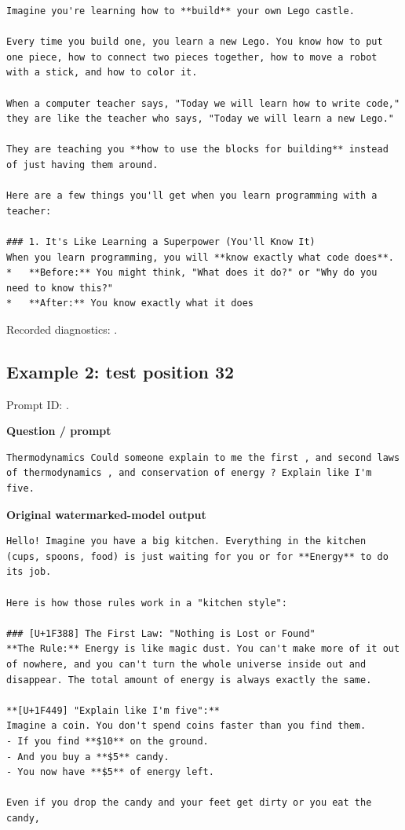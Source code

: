 \begin{Verbatim}
Imagine you're learning how to **build** your own Lego castle.

Every time you build one, you learn a new Lego. You know how to put one piece, how to connect two pieces together, how to move a robot with a stick, and how to color it.

When a computer teacher says, "Today we will learn how to write code," they are like the teacher who says, "Today we will learn a new Lego."

They are teaching you **how to use the blocks for building** instead of just having them around.

Here are a few things you'll get when you learn programming with a teacher:

### 1. It's Like Learning a Superpower (You'll Know It)
When you learn programming, you will **know exactly what code does**.
*   **Before:** You might think, "What does it do?" or "Why do you need to know this?"
*   **After:** You know exactly what it does
\end{Verbatim}

Recorded diagnostics:
\texttt{}.

\subsection{Example 2: test position
32}\label{record-docs-watermarking-qualitative-text-latent-smoothing-md-example-2-test-position-32}

Prompt ID:
\texttt{}.

\textbf{Question / prompt}

\begin{Verbatim}
Thermodynamics Could someone explain to me the first , and second laws of thermodynamics , and conservation of energy ? Explain like I'm five.
\end{Verbatim}

\textbf{Original watermarked-model output}

\begin{Verbatim}
Hello! Imagine you have a big kitchen. Everything in the kitchen (cups, spoons, food) is just waiting for you or for **Energy** to do its job.

Here is how those rules work in a "kitchen style":

### [U+1F388] The First Law: "Nothing is Lost or Found"
**The Rule:** Energy is like magic dust. You can't make more of it out of nowhere, and you can't turn the whole universe inside out and disappear. The total amount of energy is always exactly the same.

**[U+1F449] "Explain like I'm five":**
Imagine a coin. You don't spend coins faster than you find them.
- If you find **$10** on the ground.
- And you buy a **$5** candy.
- You now have **$5** of energy left.

Even if you drop the candy and your feet get dirty or you eat the candy,
\end{Verbatim}

